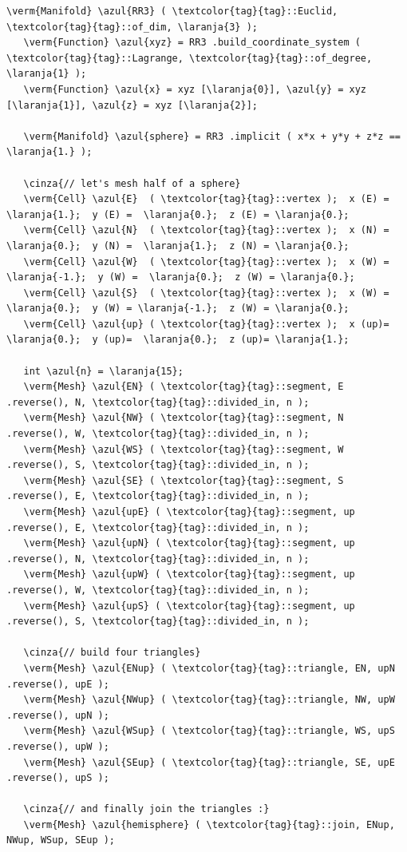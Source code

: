 \begin{Verbatim}[commandchars=\\\{\},formatcom=\small\tt,frame=single,
   label=parag-\ref{\numb section 2.\numb parag 6}.cpp,rulecolor=\color{coment},
   baselinestretch=0.94,framesep=2mm                                            ]
   \verm{Manifold} \azul{RR3} ( \textcolor{tag}{tag}::Euclid, \textcolor{tag}{tag}::of_dim, \laranja{3} );
   \verm{Function} \azul{xyz} = RR3 .build_coordinate_system ( \textcolor{tag}{tag}::Lagrange, \textcolor{tag}{tag}::of_degree, \laranja{1} );
   \verm{Function} \azul{x} = xyz [\laranja{0}], \azul{y} = xyz [\laranja{1}], \azul{z} = xyz [\laranja{2}];

   \verm{Manifold} \azul{sphere} = RR3 .implicit ( x*x + y*y + z*z == \laranja{1.} );

   \cinza{// let's mesh half of a sphere}
   \verm{Cell} \azul{E}  ( \textcolor{tag}{tag}::vertex );  x (E) =  \laranja{1.};  y (E) =  \laranja{0.};  z (E) = \laranja{0.};
   \verm{Cell} \azul{N}  ( \textcolor{tag}{tag}::vertex );  x (N) =  \laranja{0.};  y (N) =  \laranja{1.};  z (N) = \laranja{0.};
   \verm{Cell} \azul{W}  ( \textcolor{tag}{tag}::vertex );  x (W) = \laranja{-1.};  y (W) =  \laranja{0.};  z (W) = \laranja{0.};
   \verm{Cell} \azul{S}  ( \textcolor{tag}{tag}::vertex );  x (W) =  \laranja{0.};  y (W) = \laranja{-1.};  z (W) = \laranja{0.};
   \verm{Cell} \azul{up} ( \textcolor{tag}{tag}::vertex );  x (up)=  \laranja{0.};  y (up)=  \laranja{0.};  z (up)= \laranja{1.};

   int \azul{n} = \laranja{15};
   \verm{Mesh} \azul{EN} ( \textcolor{tag}{tag}::segment, E .reverse(), N, \textcolor{tag}{tag}::divided_in, n );
   \verm{Mesh} \azul{NW} ( \textcolor{tag}{tag}::segment, N .reverse(), W, \textcolor{tag}{tag}::divided_in, n );
   \verm{Mesh} \azul{WS} ( \textcolor{tag}{tag}::segment, W .reverse(), S, \textcolor{tag}{tag}::divided_in, n );
   \verm{Mesh} \azul{SE} ( \textcolor{tag}{tag}::segment, S .reverse(), E, \textcolor{tag}{tag}::divided_in, n );
   \verm{Mesh} \azul{upE} ( \textcolor{tag}{tag}::segment, up .reverse(), E, \textcolor{tag}{tag}::divided_in, n );
   \verm{Mesh} \azul{upN} ( \textcolor{tag}{tag}::segment, up .reverse(), N, \textcolor{tag}{tag}::divided_in, n );
   \verm{Mesh} \azul{upW} ( \textcolor{tag}{tag}::segment, up .reverse(), W, \textcolor{tag}{tag}::divided_in, n );
   \verm{Mesh} \azul{upS} ( \textcolor{tag}{tag}::segment, up .reverse(), S, \textcolor{tag}{tag}::divided_in, n );

   \cinza{// build four triangles}
   \verm{Mesh} \azul{ENup} ( \textcolor{tag}{tag}::triangle, EN, upN .reverse(), upE );
   \verm{Mesh} \azul{NWup} ( \textcolor{tag}{tag}::triangle, NW, upW .reverse(), upN );
   \verm{Mesh} \azul{WSup} ( \textcolor{tag}{tag}::triangle, WS, upS .reverse(), upW );
   \verm{Mesh} \azul{SEup} ( \textcolor{tag}{tag}::triangle, SE, upE .reverse(), upS );

   \cinza{// and finally join the triangles :}
   \verm{Mesh} \azul{hemisphere} ( \textcolor{tag}{tag}::join, ENup, NWup, WSup, SEup );
\end{Verbatim}

